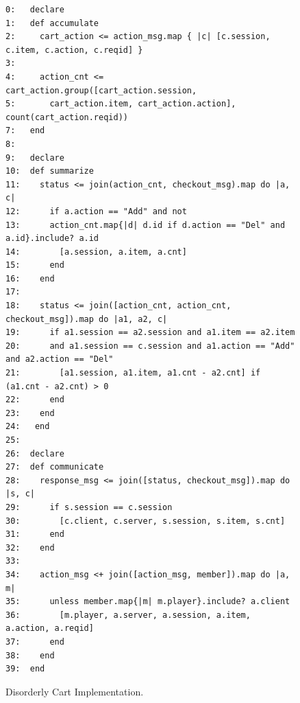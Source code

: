 \begin{figure}[t]
\begin{scriptsize}
\begin{verbatim}
0:   declare
1:   def accumulate
2:     cart_action <= action_msg.map { |c| [c.session, c.item, c.action, c.reqid] }
3:
4:     action_cnt <= cart_action.group([cart_action.session, 
5:       cart_action.item, cart_action.action], count(cart_action.reqid))
7:   end
8:
9:   declare
10:  def summarize
11:    status <= join(action_cnt, checkout_msg).map do |a, c| 
12:      if a.action == "Add" and not 
13:      action_cnt.map{|d| d.id if d.action == "Del" and a.id}.include? a.id 
14:        [a.session, a.item, a.cnt] 
15:      end 
16:    end
17:
18:    status <= join([action_cnt, action_cnt, checkout_msg]).map do |a1, a2, c| 
19:      if a1.session == a2.session and a1.item == a2.item 
20:      and a1.session == c.session and a1.action == "Add" and a2.action == "Del"
21:        [a1.session, a1.item, a1.cnt - a2.cnt] if (a1.cnt - a2.cnt) > 0
22:      end
23:    end
24:   end
25:
26:  declare 
27:  def communicate
28:    response_msg <= join([status, checkout_msg]).map do |s, c| 
29:      if s.session == c.session
30:        [c.client, c.server, s.session, s.item, s.cnt]
31:      end
32:    end
33: 
34:    action_msg <+ join([action_msg, member]).map do |a, m|
35:      unless member.map{|m| m.player}.include? a.client
36:        [m.player, a.server, a.session, a.item, a.action, a.reqid]
37:      end 
38:    end
39:  end
\end{verbatim}
\vspace{-10pt}
\caption{Disorderly Cart Implementation.}
\label{fig:pdg-disorderly}
\end{scriptsize}
\vspace{-2pt}
\end{figure}

